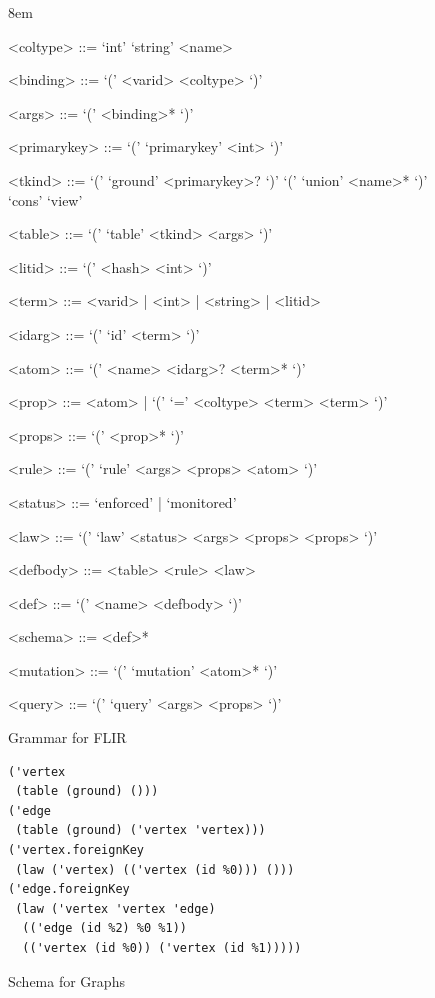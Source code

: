 \documentclass{scrartcl}
\begin{document}
\begin{figure}
  \grammarindent8em
  \begin{grammar}
    <coltype> ::= `int'
    \alt `string'
    \alt <name>

    <binding> ::= `(' <varid> <coltype> `)'
    
    <args> ::= `(' <binding>* `)'

    <primarykey> ::= `(' `primarykey' <int> `)'

    <tkind> ::= `(' `ground' <primarykey>? `)'
      \alt `(' `union' <name>* `)'
      \alt `cons'
      \alt `view'

    <table> ::= `(' `table' <tkind> <args> `)'

    <litid> ::= `(' <hash> <int> `)'

    <term> ::= <varid> | <int> | <string> | <litid>

    <idarg> ::= `(' `id' <term> `)'

    <atom> ::= `(' <name> <idarg>? <term>* `)'

    <prop> ::= <atom> | `(' `=' <coltype> <term> <term> `)'

    <props> ::= `(' <prop>* `)'

    <rule> ::= `(' `rule' <args> <props> <atom> `)'

    <status> ::= `enforced' | `monitored'

    <law> ::= `(' `law' <status> <args> <props> <props> `)'
    
    <defbody> ::= <table>
    \alt <rule>
    \alt <law>

    <def> ::= `(' <name> <defbody> `)'

    <schema> ::= <def>*

    <mutation> ::= `(' `mutation' <atom>* `)'

    <query> ::= `(' `query' <args> <props> `)'
  \end{grammar}
  \caption{Grammar for FLIR}
  \label{fig:grammar}
\end{figure}

\begin{figure}
\begin{verbatim}
('vertex
 (table (ground) ()))
('edge
 (table (ground) ('vertex 'vertex)))
('vertex.foreignKey
 (law ('vertex) (('vertex (id %0))) ()))
('edge.foreignKey
 (law ('vertex 'vertex 'edge)
  (('edge (id %2) %0 %1))
  (('vertex (id %0)) ('vertex (id %1)))))
\end{verbatim}
  \caption{Schema for Graphs}
  \label{fig:graph-schema}
\end{figure}
\end{document}
